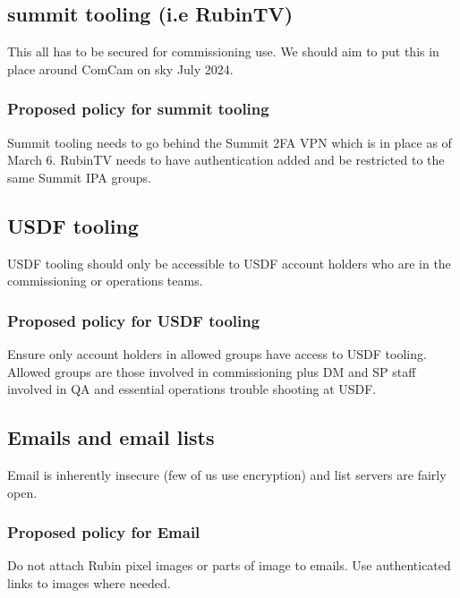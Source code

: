 \subsection{summit tooling (i.e RubinTV)}
This all has to be secured for commissioning use.
We should aim to put this in place around ComCam on sky July 2024.

\subsubsection{Proposed policy for summit tooling}
Summit tooling needs to go behind the Summit 2FA VPN which is in place as of March 6.
RubinTV needs to have authentication added and be restricted to the same Summit IPA groups.

\subsection{USDF tooling}
USDF tooling should only be accessible to USDF account holders who are in the commissioning or operations teams.
\subsubsection{Proposed policy for USDF tooling}
Ensure only account holders in allowed groups have access to USDF tooling.
Allowed groups are those involved in commissioning plus DM and SP staff involved in QA and essential operations trouble shooting at USDF.

\subsection{Emails and email  lists }
Email is inherently insecure (few of us use encryption) and list servers are fairly open.

\subsubsection{Proposed policy for Email}
Do not attach Rubin pixel images or parts of image to emails.
Use authenticated links to images where needed.


